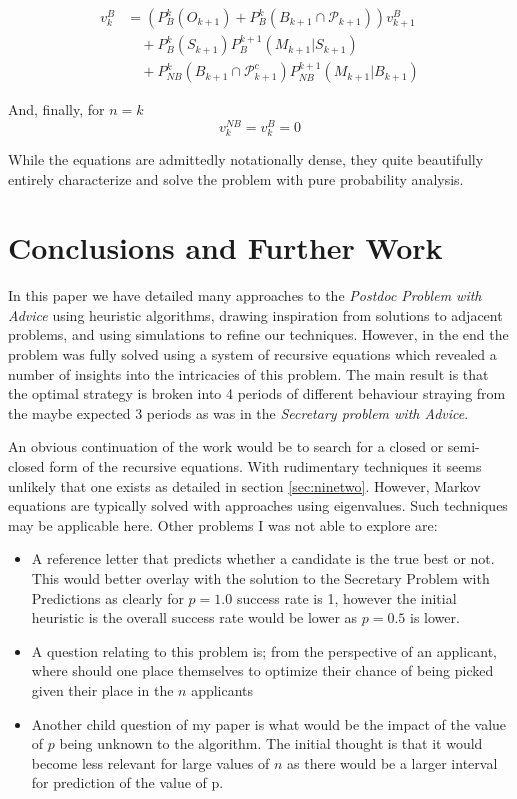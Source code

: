 \documentclass[a4paper,11pt]{article}
\begin{document}
\begin{align*}
v_k^{B} &= (P_{B}^k(O_{k+1}) +P_{B}^k(B_{k+1}\cap \mathcal{P}_{k+1})) v_{k+1}^{B} \\
        &\quad +P_{B}^k(S_{k+1})P_{B}^{k+1}(M_{k+1}|S_{k+1})\\
      &\quad + P_{NB}^k(B_{k+1} \cap \mathcal{P}_{k+1}^c)P_{NB}^{k+1}(M_{k+1}|B_{k+1})
\end{align*}

And, finally, for $n = k$
$$
v_k^{NB} = v_k^B = 0
$$

While the equations are admittedly notationally dense, they quite beautifully entirely characterize and solve the problem with pure probability analysis.


\section{Conclusions and Further Work}
\label{sec:conclusion}

In this paper we have detailed many approaches to the \textit{Postdoc Problem with Advice} using heuristic algorithms, drawing inspiration from solutions to adjacent problems, and using simulations to refine our techniques. However, in the end the problem was fully solved using a system of recursive equations which revealed a number of insights into the intricacies of this problem. The main result is that the optimal strategy is broken into 4 periods of different behaviour straying from the maybe expected 3 periods as was in the \textit{Secretary problem with Advice}.

An obvious continuation of the work would be to search for a closed or semi-closed form of the recursive equations. With rudimentary techniques it seems unlikely that one exists as detailed in section \ref{sec:ninetwo}. However, Markov equations are typically solved with approaches using eigenvalues\cite{2011MITlec}. Such techniques may be applicable here. Other problems I was not able to explore are:
\begin{itemize}
    \item A reference letter that predicts whether a candidate is the true best or not. This would better overlay with the solution to the Secretary Problem with Predictions as clearly for $p=1.0$ success rate is 1, however the initial heuristic is the overall success rate would be lower as $p=0.5$ is lower.
    \item A question relating to this problem is; from the perspective of an applicant, where should one place themselves to optimize their chance of being picked given their place in the $n$ applicants
    \item Another child question of my paper is what would be the impact of the value of $p$ being unknown to the algorithm. The initial thought is that it would become less relevant for large values of $n$ as there would be a larger interval for prediction of the value of p.
\end{itemize}
\end{document}

